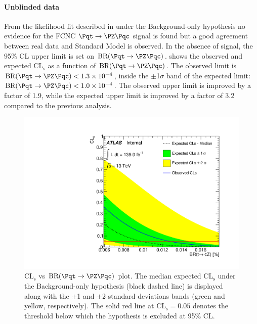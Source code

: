 \paragraph {Unblinded data}
From the likelihood fit described in  under the Background-only hypothesis no evidence for the FCNC $\mathrm{\Pqt\rightarrow\PZ\Pqc}$ signal is found but a good agreement between real data and Standard Model is observed.
In the absence of signal, the 95\% CL upper limit is set on $\mathrm{BR (\Pqt\rightarrow\PZ\Pqc)}$.
 shows the observed and expected $\mathrm{CL_{s}}$ as a function of $\mathrm{BR (\Pqt\rightarrow\PZ\Pqc)}$. The observed limit is $\mathrm{BR (\Pqt\rightarrow\PZ\Pqc)}<1.3\times 10^{-4}$, inside the $\pm$1$\sigma$ band of the expected limit: $\mathrm{BR (\Pqt\rightarrow\PZ\Pqc)}<1.0\times 10^{-4}$.
The observed upper limit is improved by a factor of 1.9, while the expected upper limit is improved by a factor of 3.2 compared to the previous analysis.
\begin{figure}[htbp]
	\centering
	\includegraphics[width=.8\textwidth]{Chapters/CH8/figures/BONLY_CRSR_DL1rc_unblind/CLsPlot}
	\caption{$\mathrm{CL_{s}}$ vs $\mathrm{BR (\Pqt\rightarrow\PZ\Pqc)}$ plot. The median expected $\mathrm{CL_{s}}$ under the Background-only hypothesis
(black dashed line) is displayed along with the $\pm$1 and $\pm$2 standard deviations bands
(green and yellow, respectively). The solid red line at $\mathrm{CL_{s}= 0.05}$ denotes the threshold below
which the hypothesis is excluded at 95\% CL.}
	\label{fig:stat:tzc:splusb:crsr:CLsPlot}
\end{figure}

